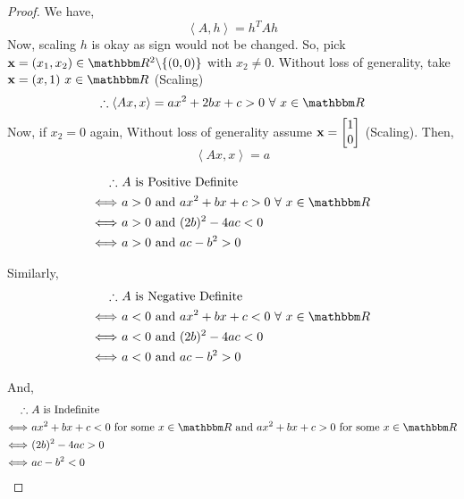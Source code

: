 \documentclass[../Analysis-3]{subfiles}
\begin{document}
\begin{proof}
    We have, \[ \left\langle A, h \right\rangle = h^TAh \]
    Now, scaling $h$ is okay as sign would not be changed. So, pick ${\bf x} = (x_1, x_2) \in \R^2 \backslash \{(0,0)\} $ with $x_2 \neq 0$.
    Without loss of generality, take ${\bf x} = (x,1) \ x \in \R$ (Scaling) \\
    \[ \therefore \left\langle Ax, x \right\rangle = ax^2 + 2bx + c > 0 \ \forall\ x \in \R \]
    Now, if $x_2 = 0$ again, Without loss of generality assume ${\bf x} = \begin{bmatrix}
            1 \\
            0
        \end{bmatrix}$ (Scaling). Then, \[ \left\langle Ax, x \right\rangle = a \]

    \begin{align*}
        \therefore          & \ A \text{ is Positive Definite}                         \\
        \Longleftrightarrow & \ a > 0 \text{ and } ax^2 + bx+c > 0 \ \forall\ x \in \R \\
        \Longleftrightarrow & \ a > 0 \text{ and } (2b)^2 - 4ac < 0                    \\
        \Longleftrightarrow & \ a > 0 \text{ and } ac - b^2 > 0
    \end{align*}

    Similarly,
    \begin{align*}
        \therefore          & \ A \text{ is Negative Definite}                         \\
        \Longleftrightarrow & \ a < 0 \text{ and } ax^2 + bx+c < 0 \ \forall\ x \in \R \\
        \Longleftrightarrow & \ a < 0 \text{ and } (2b)^2 - 4ac < 0                    \\
        \Longleftrightarrow & \ a < 0 \text{ and } ac - b^2 > 0
    \end{align*}

    And,
    \begin{align*}
        \therefore          & \ A \text{ is Indefinite}                                                                              \\
        \Longleftrightarrow & \ ax^2 + bx+c < 0 \ \text{for some } x \in \R \text{ and } ax^2 + bx+c > 0 \ \text{for some } x \in \R \\
        \Longleftrightarrow & \ (2b)^2 - 4ac > 0                                                                                     \\
        \Longleftrightarrow & \ ac - b^2 < 0
    \end{align*}
\end{proof}
\end{document}
